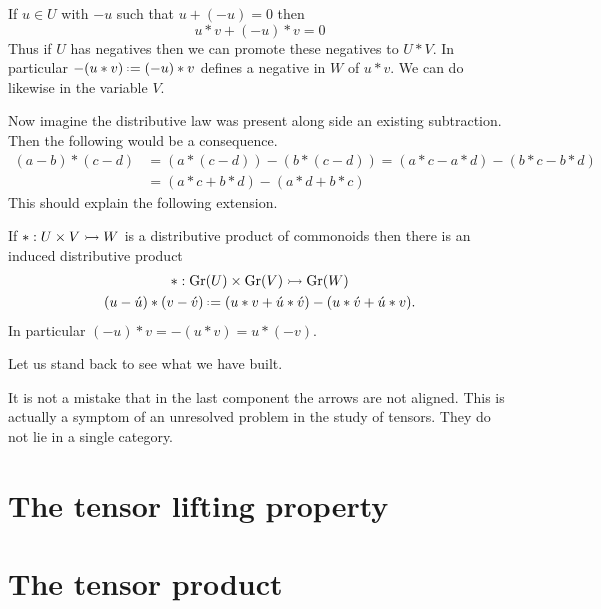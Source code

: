 \begin{proposition}
    If $u\in U$ with $-u$ such that $u+(-u)=0$ then 
    \[
        u*v + (-u)*v =0
    \]
    Thus if $U$ has negatives then we can promote these negatives to $U*V$.
    In particular $-(u*v)\defeq (-u)*v$ defines a negative in $W$ of $u*v$.
    We can do likewise in the variable $V$.  
\end{proposition}
Now imagine the distributive law was present along side an existing subtraction.
Then the following would be a consequence.
\begin{align*}
    (a-b)*(c-d) & = (a*(c-d))-(b*(c-d))
        = (a*c-a*d)-(b*c-b*d)\\
        & =(a*c+b*d)-(a*d+b*c)
\end{align*}
This should explain the following extension.

\begin{corollary}
    If $*:U\times V\rightarrowtail W$ is a distributive product of commonoids then there is an 
    induced distributive product 
    \begin{gather*}
        * :\Gr(U)\times \Gr(V)\bmto \Gr(W)\\
        (u-\acute{u})*(v-\acute{v})
        \defeq (u*v+\acute{u}*\acute{v})-(u*\acute{v}+\acute{u}*v).
    \end{gather*}
    In particular $(-u)*v=-(u*v)=u*(-v)$.
\end{corollary}

Let us stand back to see what we have built.

\begin{center}
\end{center}
It is not a mistake that in the last component the arrows are not aligned.
This is actually a symptom of an unresolved problem in the study of tensors.
They do not lie in a single category.  


\section{The tensor lifting property}



\section{The tensor product}